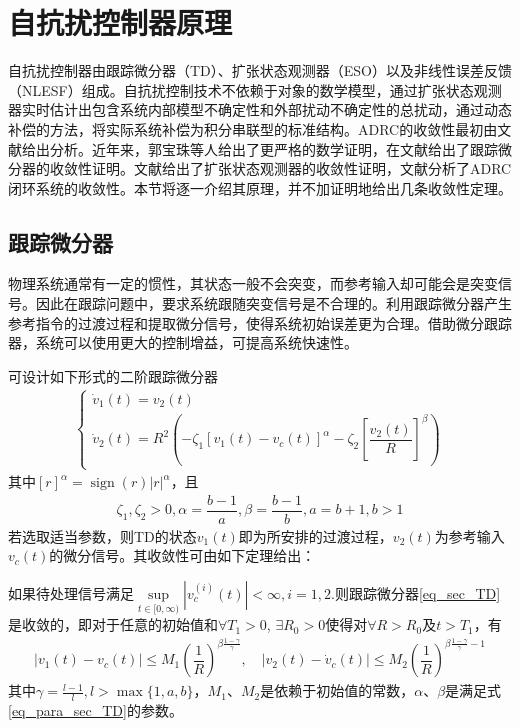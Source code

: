 \section{自抗扰控制器原理}
自抗扰控制器由跟踪微分器（TD）、扩张状态观测器（ESO）以及非线性误差反馈（NLESF）组成。自抗扰控制技术不依赖于对象的数学模型，通过扩张状态观测器实时估计出包含系统内部模型不确定性和外部扰动不确定性的总扰动，通过动态补偿的方法，将实际系统补偿为积分串联型的标准结构。ADRC的收敛性最初由文献\parencite{HanJingQing_2008}给出分析。近年来，郭宝珠等人给出了更严格的数学证明，在文献\parencite{Guo_2010,Guo_2011b,Guo_2011c,Guo_2011d}给出了跟踪微分器的收敛性证明。文献\parencite{Guo_2011,Guo_2011a,Guo_2012,Zhao_2016}给出了扩张状态观测器的收敛性证明，文献\parencite{Guo_2013,Zhao_2016a,Guo_2013,Guo_2012a}分析了ADRC闭环系统的收敛性。本节将逐一介绍其原理，并不加证明地给出几条收敛性定理。
\subsection{跟踪微分器}
物理系统通常有一定的惯性，其状态一般不会突变，而参考输入却可能会是突变信号。因此在跟踪问题中，要求系统跟随突变信号是不合理的。利用跟踪微分器产生参考指令的过渡过程和提取微分信号，使得系统初始误差更为合理。借助微分跟踪器，系统可以使用更大的控制增益，可提高系统快速性。

可设计如下形式的二阶跟踪微分器
\begin{align}
\left\{\begin{array}{l}
\dot{v}_{1}(t)=v_{2}(t) \\
\dot{v}_{2}(t)=R^{2}\left(-\zeta_{1}\left[v_{1}(t)-v_c(t)\right]^{\alpha}-\zeta_{2}\left[\dfrac{v_{2}(t)}{R}\right]^{\beta}\right)
\end{array}\right.	\label{eq_sec_TD}
\end{align}
其中$ [r]^{\alpha}=\operatorname{sign}(r)\left|r\right|^{\alpha} $，且
\begin{align}
\zeta_{1}, \zeta_{2}>0, \alpha=\dfrac{b-1}{a}, \beta=\dfrac{b-1}{b}, a=b+1, b>1	\label{eq_para_sec_TD}
\end{align}
若选取适当参数，则TD的状态$ {v}_{1}(t) $即为所安排的过渡过程，$ v_{2}(t) $为参考输入$ v_c(t) $的微分信号。其收敛性可由如下定理给出\cite{Guo_2011b}：
\begin{theorem}
	如果待处理信号满足$ \sup\limits_{t \in[0, \infty ) }\left|v^{(i)}_c(t)\right|<\infty, i=1,2.$则跟踪微分器\eqref{eq_sec_TD}是收敛的，即对于任意的初始值和$\forall T_1 >0 $, $\exists R_0 >0 $使得对$\forall R>R_0 $及$ t>T_1 $，有
	\begin{align}
	\left|v_{1}(t)-v_c(t)\right| \leq M_{1}\left(\dfrac{1}{R}\right)^{\beta {\frac{1-\gamma}{\gamma}}}, \quad\left|v_{2}(t)-\dot{v}_c(t)\right| \leq M_{2}\left(\dfrac{1}{R}\right)^{\beta \frac{1-\gamma}{\gamma}-1}
	\end{align}
	其中$\gamma=\frac{l-1}{l}, l>\max \{1, a, b\}$，$ M_1 $、$M_2$是依赖于初始值的常数，$ \alpha $、$\beta$是满足式\eqref{eq_para_sec_TD}的参数。		\label{the_sec_TD}
\end{theorem}
